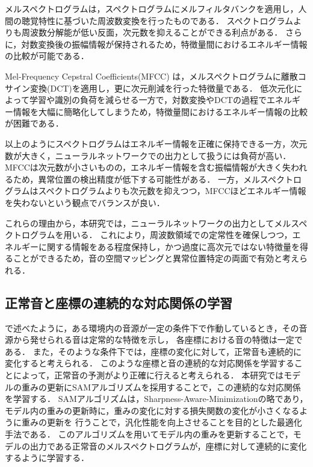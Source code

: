 \documentclass[../main]{subfiles}
\begin{document}
メルスペクトログラムは，スペクトログラムにメルフィルタバンクを適用し，人間の聴覚特性に基づいた周波数変換を行ったものである． スペクトログラムよりも周波数分解能が低い反面，次元数を抑えることができる利点がある． さらに，対数変換後の振幅情報が保持されるため，特徴量間におけるエネルギー情報の比較が可能である．

Mel-Frequency Cepstral Coefficients(MFCC) は，メルスペクトログラムに離散コサイン変換(DCT)を適用し，更に次元削減を行った特徴量である． 低次元化によって学習や識別の負荷を減らせる一方で，対数変換やDCTの過程でエネルギー情報を大幅に簡略化してしまうため，特徴量間におけるエネルギー情報の比較が困難である．


以上のようにスペクトログラムはエネルギー情報を正確に保持できる一方，次元数が大きく，ニューラルネットワークでの出力として扱うには負荷が高い． MFCCは次元数が小さいものの，エネルギー情報を含む振幅情報が大きく失われるため，異常位置の検出精度が低下する可能性がある． 一方，メルスペクトログラムはスペクトログラムよりも次元数を抑えつつ，MFCCほどエネルギー情報を失わないという観点でバランスが良い．

これらの理由から，本研究では，ニューラルネットワークの出力としてメルスペクトログラムを用いる． これにより，周波数領域での定常性を確保しつつ，エネルギーに関する情報をある程度保持し，かつ過度に高次元ではない特徴量を得ることができるため，音の空間マッピングと異常位置特定の両面で有効と考えられる．


\subsection{正常音と座標の連続的な対応関係の学習}
\label{sec:pmethod_sequential}
で述べたように，ある環境内の音源が一定の条件下で作動しているとき，その音源から発せられる音は定常的な特徴を示し，
各座標における音の特徴は一定である．
また，そのような条件下では，座標の変化に対して，正常音も連続的に変化すると考えられる．
このような座標と音の連続的な対応関係を学習することによって，正常音の予測がより正確に行えると考えられる．
本研究ではモデルの重みの更新にSAMアルゴリズムを採用することで，この連続的な対応関係を学習する．
SAMアルゴリズムは，Sharpness-Aware-Minimizationの略であり，モデル内の重みの更新時に，重みの変化に対する損失関数の変化が小さくなるように重みの更新を
行うことで，汎化性能を向上させることを目的とした最適化手法である．
このアルゴリズムを用いてモデル内の重みを更新することで，モデルの出力である正常音のメルスペクトログラムが，座標に対して連続的に変化するように学習する．
\end{document}

